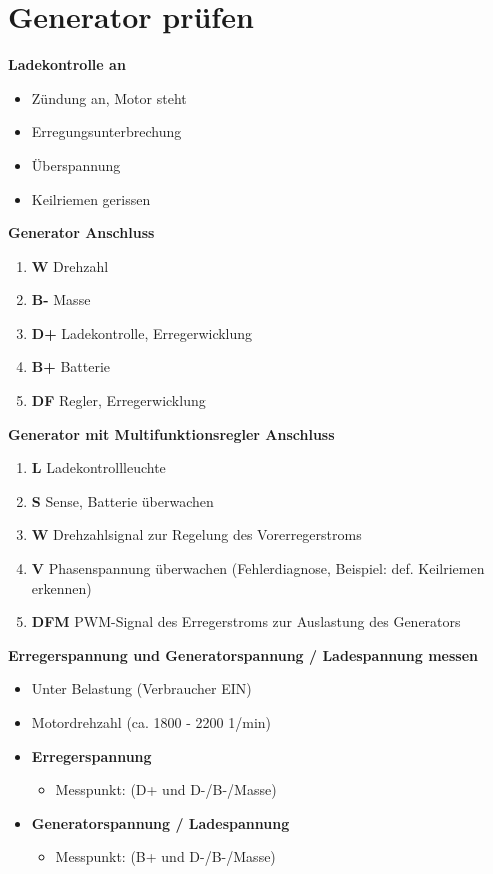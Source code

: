 \newpage

\section{Generator prüfen}\label{generator-pruefen}

\textbf{Ladekontrolle an}

\begin{itemize}
\item
  Zündung an, Motor steht
\item
  Erregungsunterbrechung
\item
  Überspannung
\item
  Keilriemen gerissen
\end{itemize}

\textbf{Generator Anschluss}

\begin{enumerate}
\item
  \textbf{W} Drehzahl
\item
  \textbf{B-} Masse
\item
  \textbf{D+} Ladekontrolle, Erregerwicklung
\item
  \textbf{B+} Batterie
\item
  \textbf{DF} Regler, Erregerwicklung
\end{enumerate}

\textbf{Generator mit Multifunktionsregler Anschluss}

\begin{enumerate}
\item
  \textbf{L} Ladekontrollleuchte
\item
  \textbf{S} Sense, Batterie überwachen
\item
  \textbf{W} Drehzahlsignal zur Regelung des Vorerregerstroms
\item
  \textbf{V} Phasenspannung überwachen (Fehlerdiagnose, Beispiel: def.
  Keilriemen erkennen)
\item
  \textbf{DFM} PWM-Signal des Erregerstroms zur Auslastung des
  Generators
\end{enumerate}

\textbf{Erregerspannung und Generatorspannung / Ladespannung messen}

\begin{itemize}
\item
  Unter Belastung (Verbraucher EIN)
\item
  Motordrehzahl (ca. 1800 - 2200 1/min)
\item
  \textbf{Erregerspannung}

  \begin{itemize}
  \item
    Messpunkt: (D+ und D-/B-/Masse)
  \end{itemize}
\item
  \textbf{Generatorspannung / Ladespannung}

  \begin{itemize}
  \item
    Messpunkt: (B+ und D-/B-/Masse)
  \end{itemize}
\end{itemize}

